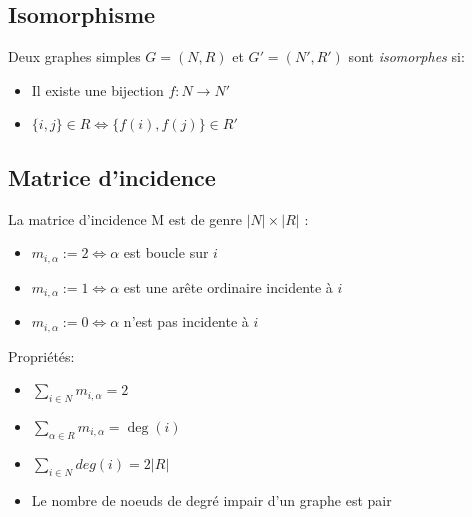 \subsection{Isomorphisme}
Deux graphes simples $G = (N,R)$ et $G' = (N',R')$ sont \emph{isomorphes} si:\\
\begin{itemize}
\item Il existe une bijection $f : N \rightarrow N'$\\
\item $\{i,j\} \in R \Leftrightarrow \{f(i), f(j)\} \in R'$\\
\end{itemize}
\subsection{Matrice d'incidence}
La matrice d'incidence M est de genre $|N|\times |R|$ :\\
\begin{itemize}
\item $m_{i,\alpha} := 2 \Leftrightarrow \alpha$ est boucle sur $i$\\
\item $m_{i,\alpha} := 1 \Leftrightarrow \alpha$ est une arête ordinaire incidente à $i$\\
\item $m_{i,\alpha} := 0 \Leftrightarrow \alpha$ n'est pas incidente à $i$\\
\end{itemize}
Propriétés:\\
\begin{itemize}
\item $\sum_{i \in N}m_{i,\alpha} = 2$\\
\item $\sum_{\alpha \in R}m_{i,\alpha} = \deg(i)$\\
\item $\sum_{i \in N}deg(i) = 2|R|$\\
\item Le nombre de noeuds de degré impair d'un graphe est pair\\
\end{itemize}

